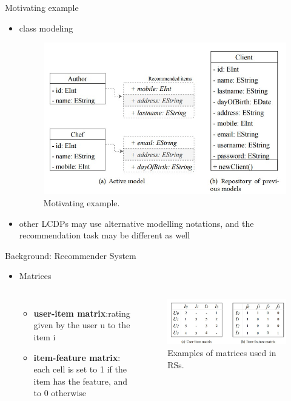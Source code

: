 \documentclass{beamer}
\begin{document}
\begin{frame}{Motivating example}
    \begin{itemize}
        \item class modeling
        \begin{figure}[htpb]
            \centering
            \includegraphics[width=0.7\linewidth]{pic/目标例子.jpg}
            \caption{ Motivating example.}
        \end{figure}
        \item other LCDPs may use alternative modelling notations, and the recommendation task may be different as well
    \end{itemize}
\end{frame}


\begin{frame}{Background: Recommender System}
    \begin{itemize}
        
        
        \item Matrices
        \begin{columns}
            \begin{itemize}
            \item \textbf{user-item matrix}:rating given by the user u to the item i
            \item \textbf{item-feature matrix}: each cell is set to 1 if the item has the feature, and to 0 otherwise
            \end{itemize}
            \begin{figure}[p]
                \centering
                \includegraphics[width=\linewidth]{pic/推荐系统两个矩阵.jpg}
                \caption{Examples of matrices used in RSs.}
            \end{figure}
        \end{columns}
        
    \end{itemize}
    
    
\end{frame}
\end{document}
